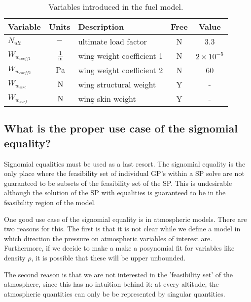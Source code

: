 \begin{footnotesize}
\begin{table}
    \centering
    \begin{tabular}{ l c l c c }
        \toprule
        Variable & Units & Description & Free & Value \\
        \midrule
        $N_{ult}$ & $-$ & ultimate load factor & N & 3.3 \\
        $W_{w_{coeff1}}$ & $~\mathrm{\tfrac{1}{m}}$ & wing weight coefficient 1 & N &
                $\mathrm{2\times 10^{-5}}$ \\
        $W_{w_{coeff2}}$ & $~\mathrm{Pa}$ & wing weight coefficient 2 & N & 60 \\
        $W_{w_{strc}}$ & $~\mathrm{N}$ & wing structural weight & Y & - \\
        $W_{w_{surf}}$ & $~\mathrm{N}$ & wing skin weight & Y & - \\
    \bottomrule
    \end{tabular}
    \caption{Variables introduced in the fuel model.}
    \label{tab:vars_wingstrcmodel}
\end{table} \end{footnotesize}

\subsection{What is the proper use case of the signomial equality?} 

Signomial equalities must be used as a last resort. The signomial equality is the only place 
where the feasibility set of individual \gls{GP}'s within a \gls{SP} solve are not guaranteed 
to be subsets of the feasibility set of the \gls{SP}. This is undesirable although
the solution of the \gls{SP} with equalities is guaranteed to be in the feasibility region
of the model.

One good use case of the signomial equality is in atmospheric models. There are two reasons
for this. The first is that it is not clear while we define a model in which direction
the pressure on atmospheric variables of interest are. Furthermore, if we decide to make a
make a posynomial fit for variables like density $\rho$, it is possible that these will be
upper unbounded.

The second reason is that we are not interested in the 'feasibility set' of the atmosphere,
since this has no
intuition behind it: at every altitude, the atmospheric quantities can only be be represented
by singular quantities.
